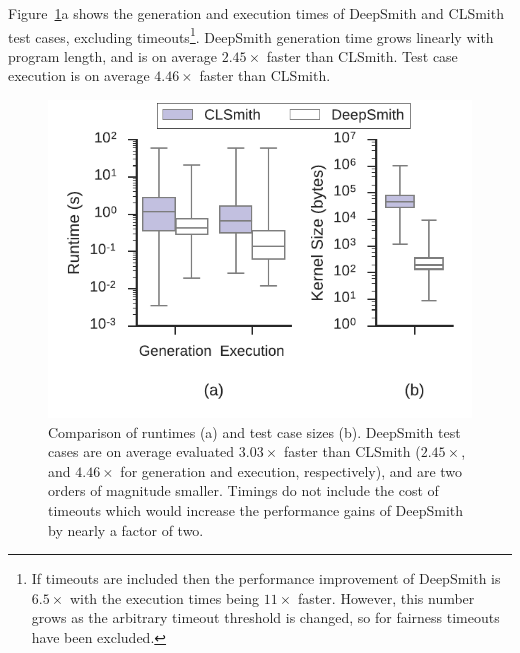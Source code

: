 \begin{table}
  \centering %
  \caption[Results from 48 hours of testing using DeepSmith]{%
    Results from 48 hours of testing using DeepSmith. System \#. as per Table~\ref{tab:deepsmith-platforms}. $\pm$ denotes optimisations off ($-$) vs on ($+$). The remaining columns denote the number of build crash (\bc), build timeout (\bto), anomalous build failure (\abf), anomalous runtime crash (\arc), anomalous wrong-output (\awo), and pass (\textbf{\cmark}) results.
  }
  
  \label{tab:megatable-deepsmith}
\end{table}

Figure~\ref{fig:deepsmith-vs-clsmith}a shows the generation and execution times of DeepSmith and CLSmith test cases, excluding timeouts\footnote{If timeouts are included then the performance improvement of DeepSmith is $6.5\times$ with the execution times being $11\times$ faster. However, this number grows as the arbitrary timeout threshold is changed, so for fairness timeouts have been excluded.}. DeepSmith generation time grows linearly with program length, and is on average $2.45\times$ faster than CLSmith. Test case execution is on average $4.46\times$ faster than CLSmith.

\begin{figure}
  \centering %
  \includegraphics[width=.72\columnwidth]{img/deepsmith-vs-clsmith}%
  \caption[Comparison of DeepSmith and CLSmith runtimes]{%
    Comparison of runtimes (a) and test case sizes (b). DeepSmith test cases are on average evaluated $3.03\times$ faster than CLSmith ($2.45\times$, and $4.46\times$ for generation and execution, respectively), and are two orders of magnitude smaller. Timings do not include the cost of timeouts which would increase the performance gains of DeepSmith by nearly a factor of two.%
  }%
  \label{fig:deepsmith-vs-clsmith}
\end{figure}

